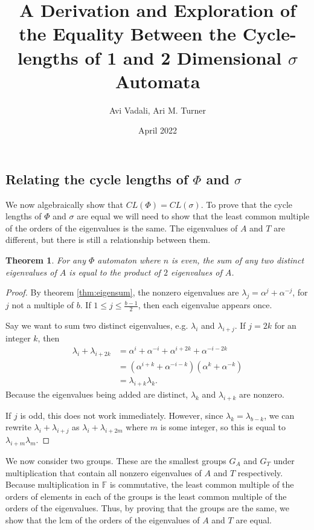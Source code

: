 \documentclass{elsarticle}
\title{A Derivation and Exploration of the Equality Between the Cycle-lengths of 1 and 2 Dimensional $\sigma$ Automata}
\author{Avi Vadali, Ari M. Turner}
\date{April 2022}
\newtheorem{thm}{Theorem}[section]
\theoremstyle{definition}
\begin{document}
\maketitle

\subsection{Relating the cycle lengths of $\Phi$ and $\sigma$}
\label{sec:CL_sigma}

\par We now algebraically show that $CL(\Phi) = CL(\sigma)$.
To prove that the cycle lengths of $\Phi$ and $\sigma$ are equal we will need to show that the least common multiple of the orders of the eigenvalues is the same. The eigenvalues of $A$ and $T$ are
different, but there is still a relationship between them.

\begin{thm}
\label{thm:sum=prod}
For any $\Phi$ automaton where $n$ is even, the sum of any two distinct eigenvalues of $A$ is equal to the product of $2$ eigenvalues of $A$.
\end{thm}

\begin{proof}
By theorem \ref{thm:eigensum},
the nonzero eigenvalues are $\lambda_j=\alpha^j+\alpha^{-j}$, for $j$ not a multiple of $b$.  If $1\leq j\leq \frac{b-1}{2}$, then each eigenvalue appears once. 

Say we want to sum two distinct eigenvalues, e.g. $\lambda_i$ and $\lambda_{i+j}$.
If $j = 2k$ for an integer $k$,
then 
\begin{align}
    \lambda_i+\lambda_{i+2k}&=\alpha^i+\alpha^{-i}+\alpha^{i+2k}+\alpha^{-i-2k}\nonumber\\
    &=(\alpha^{i+k}+\alpha^{-i-k})(\alpha^{k}+\alpha^{-k})\nonumber\\
    &=\lambda_{i+k}\lambda_k.
    \label{eq:sumproduct}
\end{align}
Because the eigenvalues being added are distinct, $\lambda_k$ and $\lambda_{i+k}$ are nonzero.

If $j$ is odd, this does not work immediately.  However, since $\lambda_{k} = \lambda_{b - k}$, we can rewrite $\lambda_i + \lambda_{i+j}$ as $\lambda_i + \lambda_{i + 2m}$ where $m$ is some integer, so this is equal to $\lambda_{i+m}\lambda_m$.
\end{proof}

\par  We now consider two groups.  These are
the smallest groups $G_A$ and $G_T$ under multiplication that contain all nonzero eigenvalues of $A$ and $T$ respectively.  Because multiplication in $\mathbb{F}$ is commutative, the least common multiple of the orders of elements in each of the groups is the least common multiple of the orders of the eigenvalues.  Thus, by proving that the groups are the same, we show that the lcm of the orders of the eigenvalues of $A$ and $T$ are equal.
\end{document}
